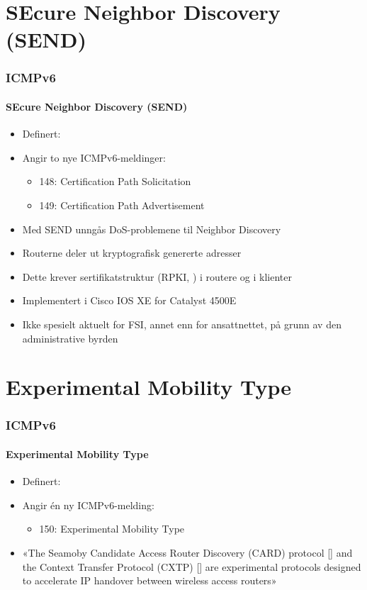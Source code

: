 \section{SEcure Neighbor Discovery (SEND)}
\begin{frame}%
  \frametitle{ICMPv6}
  \framesubtitle{SEcure Neighbor Discovery (SEND)}
  \begin{itemize}%
  \item Definert: 
  \item Angir to nye ICMPv6-meldinger:
    \begin{itemize}%
    \item 148: Certification Path Solicitation
    \item 149: Certification Path Advertisement
    \end{itemize}
  \item Med SEND unngås DoS-problemene til Neighbor Discovery
  \item Routerne deler ut kryptografisk genererte adresser 
  \item Dette krever sertifikatstruktur (RPKI, ) i routere og i klienter
  \item Implementert i Cisco IOS XE for Catalyst 4500E
  \item Ikke spesielt aktuelt for FSI, annet enn for ansattnettet, på
    grunn av den administrative byrden
  \end{itemize}
\end{frame}

\section{Experimental Mobility Type}
\begin{frame}%
  \frametitle{ICMPv6}
  \framesubtitle{Experimental Mobility Type}
  \begin{itemize}%
  \item Definert: 
  \item Angir én ny ICMPv6-melding:
    \begin{itemize}%
    \item 150: Experimental Mobility Type
    \end{itemize}
  \item «The Seamoby Candidate Access Router Discovery (CARD) protocol
    [] and the Context Transfer Protocol (CXTP) []
    are experimental protocols designed to accelerate IP handover
    between wireless access routers»
  \end{itemize}
\end{frame}

